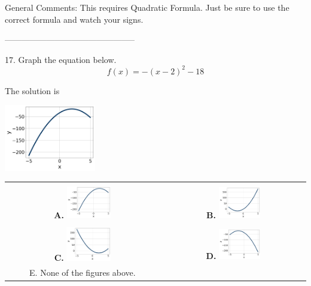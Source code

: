 \documentclass{article}[14pt]
\begin{document}
General Comments: This requires Quadratic Formula. Just be sure to use the correct formula and watch your signs.

-----------------------------------------------

17. Graph the equation below.
$$ f(x) = -(x-2)^2 - 18 $$ 

 
 The solution is  
 \begin{center} \includegraphics[width=0.3\textwidth]{../Figures/quadraticEquationToGraphAB.png} \end{center}\begin{tabular}{|c|c|} 
\hline 
 & \tabularnewline 
 \textbf{A.} \includegraphics[width=0.3\textwidth]{../Figures/quadraticEquationToGraphAB.png} & \textbf{B.} \includegraphics[width=0.3\textwidth]{../Figures/quadraticEquationToGraphBB.png} \tabularnewline 
\hline 
 & \tabularnewline 
 \textbf{C.} \includegraphics[width=0.3\textwidth]{../Figures/quadraticEquationToGraphCB.png} & \textbf{D.} \includegraphics[width=0.3\textwidth]{../Figures/quadraticEquationToGraphDB.png} \tabularnewline 
\hline 
 E. None of the figures above. & \tabularnewline 
\hline 
 \end{tabular} 
 
\end{document}
